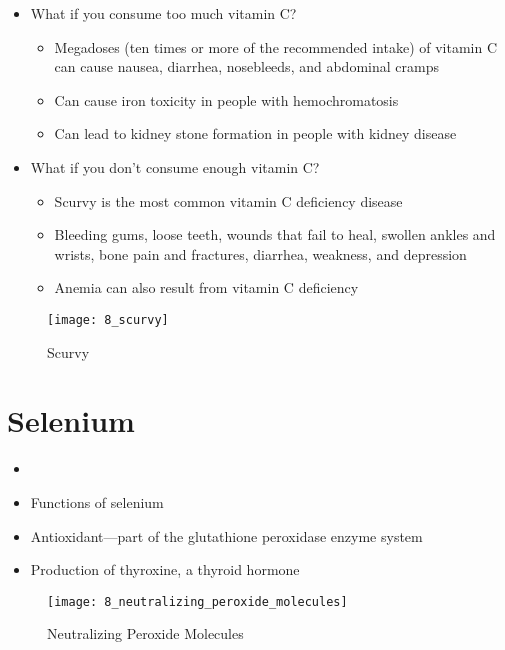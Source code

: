 \documentclass[title={Chapter 8}]{fdsn201notes}
\begin{document}
\begin{itemize}
	\item What if you consume too much vitamin C?
	\begin{itemize}
		\item Megadoses (ten times or more of the recommended intake) of vitamin C can cause nausea, diarrhea, nosebleeds, and abdominal cramps
		\item Can cause iron toxicity in people with hemochromatosis
		\item Can lead to kidney stone formation in people with kidney disease
	\end{itemize}
	\item What if you don’t consume enough vitamin C?
	\begin{itemize}
		\item Scurvy is the most common vitamin C deficiency disease
		\item Bleeding gums, loose teeth, wounds that fail to heal, swollen ankles and wrists, bone pain and fractures, diarrhea, weakness, and depression
		\item Anemia can also result from vitamin C deficiency
	\end{itemize}
\end{itemize}

\begin{figure}[H]
	\centering
	\texttt{[image: 8\_scurvy]}
	\caption{Scurvy}
	\label{fig:scurvy}
\end{figure}

\section{Selenium}\label{sec:Selenium}
\begin{itemize}
	\item {}
	\item Functions of selenium
	\item Antioxidant—part of the glutathione peroxidase enzyme system
	\item Production of thyroxine, a thyroid hormone
\end{itemize}

\begin{figure}[H]
	\centering
	\texttt{[image: 8\_neutralizing\_peroxide\_molecules]}
	\caption{Neutralizing Peroxide Molecules}
	\label{fig:neutralizing-peroxide-molecules}
\end{figure}
\end{document}
